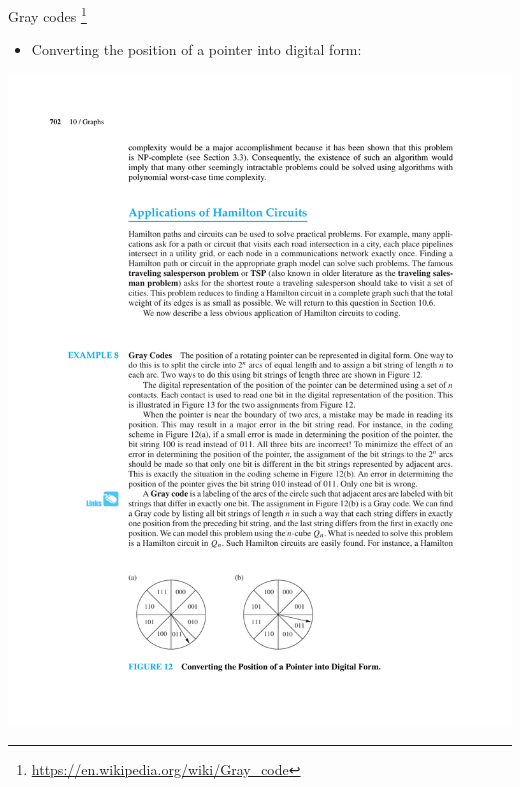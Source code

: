 \documentclass{beamer}
\theoremstyle{definition}
\begin{document}
\begin{frame}{Gray codes \footnote{\scriptsize \url{https://en.wikipedia.org/wiki/Gray_code}}}
   \begin{itemize}
        \item Converting the position of a pointer into digital form:
    \end{itemize}
    \centering \includegraphics[trim={5cm 3.2cm 8cm 21cm},clip,width=.8\linewidth]{p702}
\end{frame}
\end{document}
